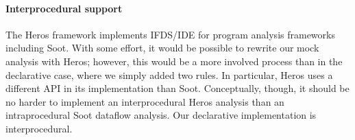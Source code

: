 


\paragraph{Interprocedural support} The Heros framework\cite{bodden12:_inter_proced_data_flow_analy} implements IFDS/IDE for program analysis frameworks including Soot. With some effort, it would be possible to rewrite our mock analysis with Heros; however, this would be a more involved process than in the declarative case, where we simply added two rules. In particular, Heros uses a different API in its implementation than Soot. Conceptually, though, it should be no harder to implement an interprocedural Heros analysis than an intraprocedural Soot dataflow analysis. Our declarative implementation is interprocedural.





